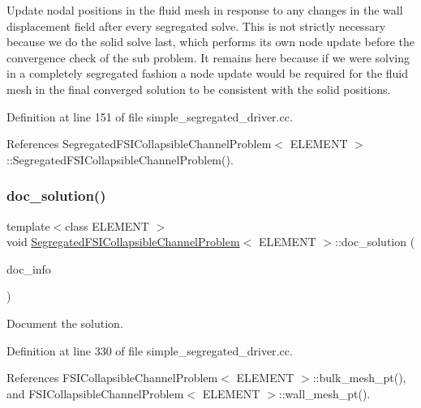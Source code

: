 Update nodal positions in the fluid mesh in response to any changes in the wall displacement field after every segregated solve. This is not strictly necessary because we do the solid solve last, which performs its own node update before the convergence check of the sub problem. It remains here because if we were solving in a completely segregated fashion a node update would be required for the fluid mesh in the final converged solution to be consistent with the solid positions. 

Definition at line 151 of file simple\+\_\+segregated\+\_\+driver.\+cc.



References Segregated\+F\+S\+I\+Collapsible\+Channel\+Problem$<$ E\+L\+E\+M\+E\+N\+T $>$\+::\+Segregated\+F\+S\+I\+Collapsible\+Channel\+Problem().

\mbox{\label{classSegregatedFSICollapsibleChannelProblem_a0f7364ea880f2e740e1960830246e028}} 
\subsubsection{\texorpdfstring{doc\+\_\+solution()}{doc\_solution()}}
{\footnotesize\ttfamily template$<$class E\+L\+E\+M\+E\+NT $>$ \\
void \hyperlink{classSegregatedFSICollapsibleChannelProblem}{Segregated\+F\+S\+I\+Collapsible\+Channel\+Problem}$<$ E\+L\+E\+M\+E\+NT $>$\+::doc\+\_\+solution (\begin{DoxyParamCaption}\item[{Doc\+Info \&}]{doc\+\_\+info }\end{DoxyParamCaption})}



Document the solution. 



Definition at line 330 of file simple\+\_\+segregated\+\_\+driver.\+cc.



References F\+S\+I\+Collapsible\+Channel\+Problem$<$ E\+L\+E\+M\+E\+N\+T $>$\+::bulk\+\_\+mesh\+\_\+pt(), and F\+S\+I\+Collapsible\+Channel\+Problem$<$ E\+L\+E\+M\+E\+N\+T $>$\+::wall\+\_\+mesh\+\_\+pt().



